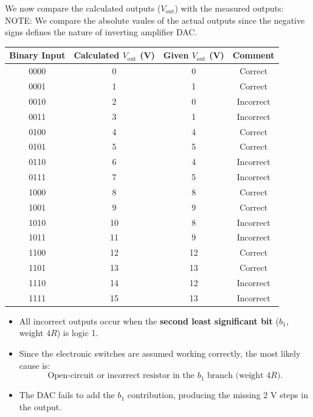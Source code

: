 \begin{solutionblock}

We now compare the calculated outputs ($V_{\text{out}}$) with the measured outputs:
\\
NOTE: We compare the absolute vaules of the actual outputs since the negative signs 
defines the nature of inverting amplifier DAC.
\begin{center}
\begin{tabular}{|c|c|c|c|}
\hline
\textbf{Binary Input} & \textbf{Calculated $V_{\text{out}}$ (V)} & \textbf{Given $V_{\text{out}}$ (V)} & \textbf{Comment} \\
\hline
0000 & 0   & 0   &  Correct \\
0001 & 1   & 1   &  Correct \\
0010 & 2   & 0   &  Incorrect \\
0011 & 3   & 1   &  Incorrect \\
0100 & 4   & 4   &  Correct \\
0101 & 5   & 5   &  Correct \\
0110 & 6   & 4   &  Incorrect \\
0111 & 7   & 5   &  Incorrect \\
1000 & 8   & 8   &  Correct \\
1001 & 9   & 9   &  Correct \\
1010 & 10  & 8   &  Incorrect \\
1011 & 11  & 9   &  Incorrect \\
1100 & 12  & 12  &  Correct \\
1101 & 13  & 13  &  Correct \\
1110 & 14  & 12  &  Incorrect \\
1111 & 15  & 13  &  Incorrect \\
\hline
\end{tabular}
\end{center}
\end{solutionblock}


\begin{solutionblock}
\begin{itemize}
    \item All incorrect outputs occur when the \textbf{second least significant bit} ($b_1$, weight $4R$) is logic 1.
    \item Since the electronic switches are assumed working correctly, the most likely cause is:
    \[
    \boxed{\text{Open-circuit or incorrect resistor in the $b_1$ branch (weight $4R$)}}.
    \]
    \item The DAC fails to add the $b_1$ contribution, producing the missing 2 V steps in the output.
\end{itemize}
\end{solutionblock}

